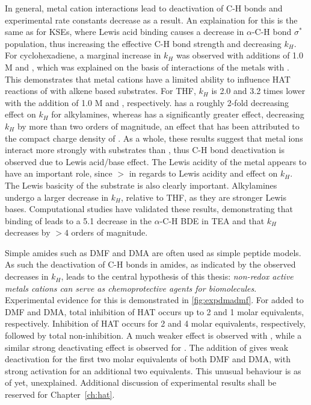 In general, metal cation interactions lead to deactivation of C-H bonds and
experimental rate constants decrease as a result. An explaination for this is
the same as for KSEs, where Lewis acid binding causes a decrease in $\alpha$-C-H
bond $\sigma^*$ population, thus increasing the effective C-H bond strength and
decreasing $k_H$. For cyclohexadiene, a marginal increase in $k_H$ was observed
with additions of 1.0 M  and , which was explained on
the basis of interactions of the metals with \cumo. This demonstrates that metal
cations have a limited ability to influence HAT reactions of \cumo with alkene
based substrates. For THF, $k_H$ is 2.0 and 3.2 times lower with the addition of
1.0 M  and , respectively.  has a roughly
2-fold decreasing effect on $k_H$ for alkylamines, whereas  has a
significantly greater effect, decreasing $k_H$ by more than two orders of
magnitude, an effect that has been attributed to the compact charge density of
. As a whole, these results suggest that metal ions interact more
strongly with substrates than \cumo, thus C-H bond deactivation is observed due
to Lewis acid/base effect. The Lewis acidity of the metal appears to have an
important role, since  $>$  in regards to Lewis acidity
and effect on $k_H$. The Lewis basicity of the substrate is also clearly
important. Alkylamines undergo a larger decrease in $k_H$, relative to THF, as
they are stronger Lewis bases. Computational studies have validated these
results, demonstrating that binding of  leads to a 5.1 \kcalmol
decrease in the $\alpha$-C-H BDE in TEA and that $k_H$ decreases by
$>4$ orders of magnitude.\cite{Nova2014}

Simple amides such as DMF and DMA are often used as simple peptide
models.\cite{Salamone2015a} As such the deactivation of C-H bonds in amides, as
indicated by the observed decreases in $k_H$, leads to the central hypothesis of
this thesis: \emph{non-redox active metals cations can serve as chemoprotective
  agents for biomolecules}. Experimental evidence for this is demonstrated in
\ref{fig:expdmadmf}. For  added to DMF and DMA, total inhibition of
HAT occurs up to 2 and 1 molar equivalents, respectively. Inhibition of HAT
occurs for 2 and 4 molar equivalents, respectively, followed by total
non-inhibition. A much weaker effect is observed with , while a
similar strong deactivating effect is observed for . The addition
of  gives weak deactivation for the first two molar equivalents of
both DMF and DMA, with strong activation for an additional two equivalents. This
unusual behaviour is as of yet, unexplained. Additional discussion of
experimental results shall be reserved for Chapter~\ref{ch:hat}.

